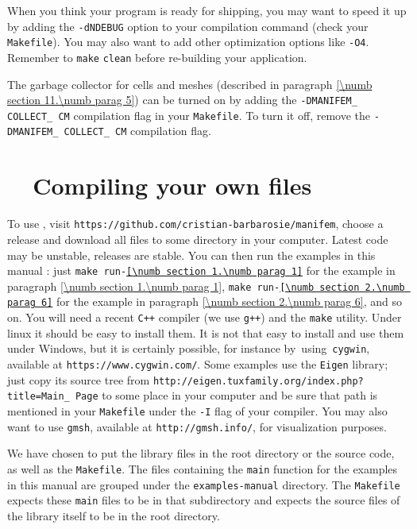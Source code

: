 When you think your program is ready for shipping, you may want to speed it up
by adding the {\small\tt -dNDEBUG} option to your compilation command
(check your {\small\tt Makefile}).
You may also want to add other optimization options like {\small\tt -O4}.
Remember to {\small\tt make} {\small\tt  clean} before re-building your application.

The garbage collector for cells and meshes (described in paragraph
\ref{\numb section 11.\numb parag 5}) can be turned on by adding the
{\small\tt -DMANIFEM\_\,COLLECT\_\,CM} compilation flag in your {\small\tt Makefile}.
To turn it off, remove the {\small\tt -DMANIFEM\_\,COLLECT\_\,CM} compilation flag.


\section{~~Compiling your own files}\label{\numb section 11.\numb parag 16}

To use \maniFEM, visit {\small\tt https://github.com/cristian-barbarosie/manifem},
choose a release and download all files to some directory in your computer.
Latest code may be unstable, releases are stable.
You can then run the examples in this manual :
just {\small\tt make run-\ref{\numb section 1.\numb parag 1}}
for the example in paragraph \ref{\numb section 1.\numb parag 1},
{\small\tt make run-\ref{\numb section 2.\numb parag 6}}
for the example in paragraph \ref{\numb section 2.\numb parag 6}, and so on.
You will need a recent {\tt C++} compiler (we use {\tt g++}) and the {\tt make} utility.
Under linux it should be easy to install them.
It is not that easy to install and use them under Windows, but it is certainly possible,
for instance \hbox{by using {\small\tt cygwin}}, available at {\small\tt https://www.cygwin.com/}.
Some examples use the {\small\tt Eigen} library; just copy its source tree
from {\small\tt http://eigen.tuxfamily.org/index.php?title=Main\_\,Page}
to some place in your computer and be sure that
path is mentioned in your {\small\tt Makefile}
under the {\small\tt -I} flag of your compiler.
You may also want to use {\tt gmsh}, available at {\small\tt http://gmsh.info/},
for visualization purposes.

We have chosen to put the library files in the root directory or the source code,
as well as the {\small\tt Makefile}.
The files containing the {\small\tt main} function for the examples in this manual are
grouped under the {\small\tt examples-manual} directory.
The {\small\tt Makefile} expects these {\small\tt main} files to be in that subdirectory
and expects the source files of the library itself to be in the root directory.

